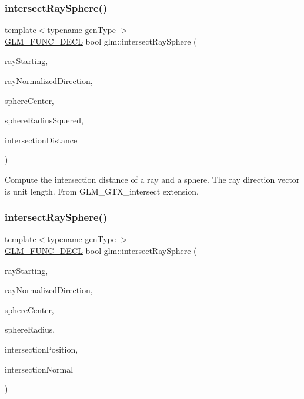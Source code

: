 \subsubsection{\texorpdfstring{intersect\+Ray\+Sphere()}{intersectRaySphere()}\hspace{0.1cm}{\footnotesize\ttfamily [1/2]}}
{\footnotesize\ttfamily template$<$typename gen\+Type $>$ \\
\mbox{\hyperlink{setup_8hpp_ab2d052de21a70539923e9bcbf6e83a51}{G\+L\+M\+\_\+\+F\+U\+N\+C\+\_\+\+D\+E\+CL}} bool glm\+::intersect\+Ray\+Sphere (\begin{DoxyParamCaption}\item[{gen\+Type const \&}]{ray\+Starting,  }\item[{gen\+Type const \&}]{ray\+Normalized\+Direction,  }\item[{gen\+Type const \&}]{sphere\+Center,  }\item[{typename gen\+Type\+::value\+\_\+type const}]{sphere\+Radius\+Squered,  }\item[{typename gen\+Type\+::value\+\_\+type \&}]{intersection\+Distance }\end{DoxyParamCaption})}

Compute the intersection distance of a ray and a sphere. The ray direction vector is unit length. From G\+L\+M\+\_\+\+G\+T\+X\+\_\+intersect extension. \mbox{\label{group__gtx__intersect_gad28c00515b823b579c608aafa1100c1d}} 
\subsubsection{\texorpdfstring{intersect\+Ray\+Sphere()}{intersectRaySphere()}\hspace{0.1cm}{\footnotesize\ttfamily [2/2]}}
{\footnotesize\ttfamily template$<$typename gen\+Type $>$ \\
\mbox{\hyperlink{setup_8hpp_ab2d052de21a70539923e9bcbf6e83a51}{G\+L\+M\+\_\+\+F\+U\+N\+C\+\_\+\+D\+E\+CL}} bool glm\+::intersect\+Ray\+Sphere (\begin{DoxyParamCaption}\item[{gen\+Type const \&}]{ray\+Starting,  }\item[{gen\+Type const \&}]{ray\+Normalized\+Direction,  }\item[{gen\+Type const \&}]{sphere\+Center,  }\item[{const typename gen\+Type\+::value\+\_\+type}]{sphere\+Radius,  }\item[{gen\+Type \&}]{intersection\+Position,  }\item[{gen\+Type \&}]{intersection\+Normal }\end{DoxyParamCaption})}

